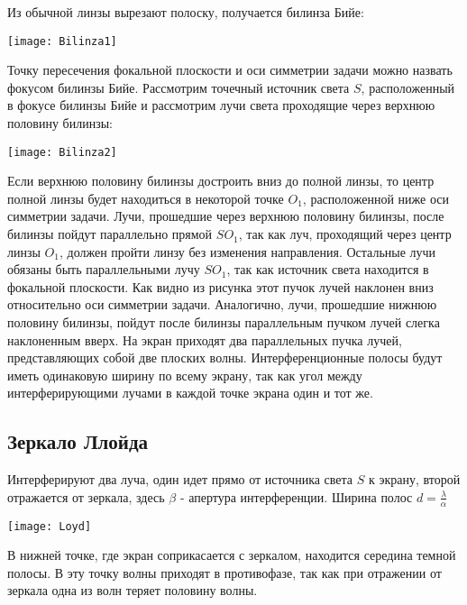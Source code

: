 Из обычной линзы вырезают полоску, получается билинза Бийе:

\begin{center}
\texttt{[image: Bilinza1]}
\end{center}

Точку пересечения фокальной плоскости и оси симметрии задачи можно назвать фокусом билинзы Бийе. Рассмотрим точечный источник света $S$, расположенный в фокусе билинзы Бийе и рассмотрим лучи света проходящие через верхнюю половину билинзы:

\begin{center}
\texttt{[image: Bilinza2]}
\end{center}

Если  верхнюю  половину  билинзы  достроить  вниз  до  полной  линзы,  то центр  полной  линзы  будет  находиться  в  некоторой  точке $O_1$,  расположенной ниже оси симметрии задачи.       Лучи,  прошедшие  через  верхнюю  половину  билинзы,  после  билинзы пойдут параллельно прямой $SO_1$, так как луч, проходящий через центр линзы $O_1$, должен пройти линзу без изменения направления. Остальные лучи обязаны быть параллельными лучу $SO_1$, так как источник света находится в фокальной плоскости. Как видно из рисунка этот пучок лучей наклонен вниз относительно оси симметрии задачи.       Аналогично, лучи, прошедшие нижнюю половину билинзы, пойдут после билинзы параллельным пучком лучей слегка наклоненным вверх.       На  экран  приходят  два  параллельных  пучка  лучей,  представляющих собой  две  плоских  волны.  Интерференционные  полосы  будут  иметь одинаковую ширину по всему экрану, так как угол между интерферирующими лучами в каждой точке экрана один и тот же.

\subsection{Зеркало Ллойда}

Интерферируют два луча, один идет прямо от источника света $S$ к экрану, второй отражается от зеркала, здесь $\beta$ - апертура интерференции. Ширина полос $ d = \frac{\lambda}{\alpha}$
\begin{center}
\texttt{[image: Loyd]}
\end{center}
В нижней точке, где экран соприкасается с зеркалом, находится середина темной полосы. В эту точку волны приходят в противофазе, так как при отражении от зеркала одна из волн теряет половину волны.